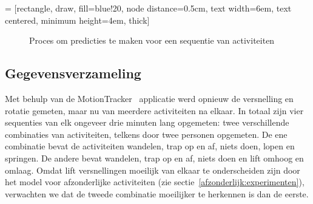 \documentclass{article}
\begin{document}
 = [rectangle, draw, fill=blue!20, node distance=0.5cm, text width=6em, text centered, minimum height=4em, thick]
\begin{figure}[H]
\begin{center}
\end{center}
\caption{Proces om predicties te maken voor een sequentie van activiteiten}
\label{fig:proces:sequenties}
\end{figure}


\subsection{Gegevensverzameling}
\label{seq:gegevens}

Met behulp van de MotionTracker~\cite{meert and schietgat:motiontracker} applicatie werd opnieuw de versnelling en rotatie gemeten, maar nu van meerdere activiteiten na elkaar. In totaal zijn vier sequenties van elk ongeveer drie minuten lang opgemeten: twee verschillende combinaties van activiteiten, telkens door twee personen opgemeten. De ene combinatie bevat de activiteiten wandelen, trap op en af, niets doen, lopen en springen. De andere bevat wandelen, trap op en af, niets doen en lift omhoog en omlaag. Omdat lift versnellingen moeilijk van elkaar te onderscheiden zijn door het model voor afzonderlijke activiteiten (zie sectie~\ref{afzonderlijk:experimenten}), verwachten we dat de tweede combinatie moeilijker te herkennen is dan de eerste.
\end{document}
